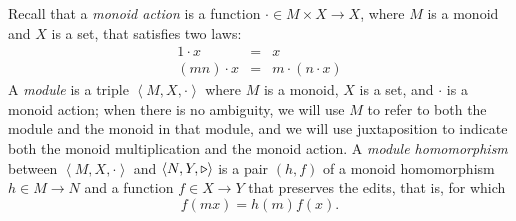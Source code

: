 \begin{defn}[$R$-similarity]
\begin{theorem}
\begin{lemma}
\begin{theorem}[No products]
\begin{lemma}
\begin{defn}
\begin{theorem}
\begin{theorem}
\begin{corollary}[Hylomorphism]
\begin{defn}
\begin{defn}
\begin{defn}[Symmetrization]
\begin{theorem}
Recall that a \emph{monoid action} is a function $\cdot \in M \times X \to
X$, where $M$ is a monoid and $X$ is a set, that satisfies two laws:
\begin{eqnarray*}
            1 \cdot x &=& x \\
            (mn)\cdot x &=& m\cdot(n\cdot x)
\end{eqnarray*}
%
A \emph{module} is a triple $\left<M,X,\cdot\right>$ where $M$ is a monoid,
$X$ is a set, and $\cdot$ is a monoid action; when there is no ambiguity, we
will use $M$ to refer to both the module and the monoid in that module, and
we will use juxtaposition to indicate both the monoid multiplication and the
monoid action.
%        
A \emph{module homomorphism} between $\left<M,X,\cdot\right>$ and
$\left<N,Y,\triangleright\right>$ is a pair $(h,f)$ of a monoid homomorphism $h \in M
\to N$ and a function $f \in X \to Y$ that preserves the edits, that is, for 
which 
\[f(mx) = h(m)f(x).\]


\end{theorem}
\end{defn}
\end{defn}
\end{defn}
\end{corollary}
\end{theorem}
\end{theorem}
\end{defn}
\end{lemma}
\end{theorem}
\end{lemma}
\end{theorem}
\end{defn}
